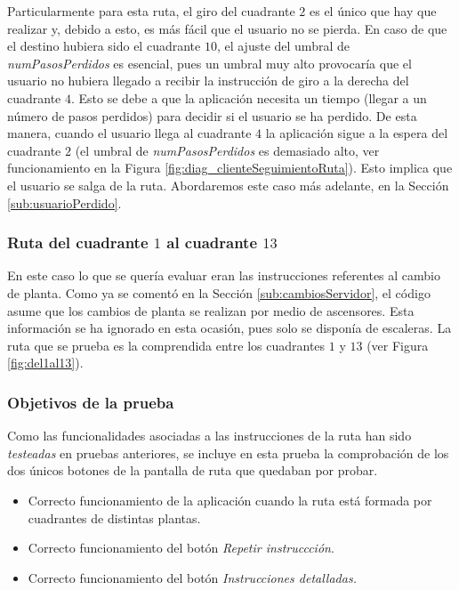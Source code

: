 Particularmente para esta ruta, el giro del cuadrante $2$ es el único que hay que realizar y, debido a esto, es más fácil que el usuario no se pierda. En caso de que el destino hubiera sido el cuadrante $10$, el ajuste del umbral de \textit{numPasosPerdidos} es esencial, pues un umbral muy alto provocaría que el usuario no hubiera llegado a recibir la instrucción de giro a la derecha del cuadrante $4$. Esto se debe a que la aplicación necesita un tiempo (llegar a un número de pasos perdidos) para decidir si el usuario se ha perdido. De esta manera, cuando el usuario llega al cuadrante $4$ la aplicación sigue a la espera del cuadrante $2$ (el umbral de \textit{numPasosPerdidos} es demasiado alto, ver funcionamiento en la Figura \ref{fig:diag_clienteSeguimientoRuta}). Esto implica que el usuario se salga de la ruta. Abordaremos este caso más adelante, en la Sección \ref{sub:usuarioPerdido}.


\subsubsection{Ruta del cuadrante $1$ al cuadrante $13$}
\label{subsub:del1al13}

En este caso lo que se quería evaluar eran las instrucciones referentes al cambio de planta. Como ya se comentó en la Sección \ref{sub:cambiosServidor}, el código asume que los cambios de planta se realizan por medio de ascensores. Esta información se ha ignorado en esta ocasión, pues solo se disponía de escaleras. La ruta que se prueba es la comprendida entre los cuadrantes $1$ y $13$ (ver Figura \ref{fig:del1al13}).

\subsubsection*{Objetivos de la prueba}

Como las funcionalidades asociadas a las instrucciones de la ruta han sido \textit{testeadas} en pruebas anteriores, se incluye en esta prueba la comprobación de los dos únicos botones de la pantalla de ruta que quedaban por probar.

\begin{itemize}
	\item Correcto funcionamiento de la aplicación cuando la ruta está formada por cuadrantes de distintas plantas. 
	
	\item Correcto funcionamiento del botón \textit{Repetir instruccción}.
	
	\item Correcto funcionamiento del botón \textit{Instrucciones detalladas.}
\end{itemize}

